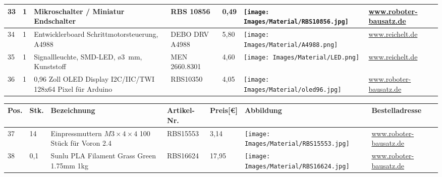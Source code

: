 \begin{center}
\begin{tabularx}{\textwidth}{|p{0.4cm}|p{0.4cm}|X|X|p{1cm}|X|X|}
	\hline
	33 & 1 & Mikroschalter / Miniatur Endschalter & RBS 10856 & 0,49  & \texttt{[image: Images/Material/RBS10856.jpg]} & \href{https://www.roboter-bausatz.de/p/mikroschalter-miniatur-endschalter}{www.roboter-bausatz.de} \\
	\hline
	34 & 1 & Entwicklerboard Schrittmotorsteuerung, A4988 & DEBO DRV A4988 & 5,80  & \texttt{[image: Images/Material/A4988.png]} & \href{https://www.reichelt.de/sg/de/entwicklerboards-schrittmotorsteuerung-a4988-debo-drv-a4988-p282646.html}{www.reichelt.de} \\
	\hline
	35 & 1 & Signallleuchte, SMD-LED, ø3\ mm, Kunststoff & MEN 2660.8301 & 4,60 & \texttt{[image: Images/Material/LED.png]} & \href{https://www.reichelt.de/sg/de/signallleuchte-smd-led-3mm-kunststoff-men-2660-8301-p366869.html}{www.reichelt.de} \\
	\hline
	36 & 1 & 0,96 Zoll OLED Display I2C/IIC/TWI 128x64 Pixel für Arduino & RBS10350 & 4,05 & \texttt{[image: Images/Material/oled96.jpg]} & \href{https://www.roboter-bausatz.de/p/0.96-oled-display-i2c-iic-twi-128x64-pixel-fuer-arduino}{www.roboter-bausatz.de} \\
	\hline

		\end{tabularx}
		
	\fontsize{8}{10}\selectfont
	\begin{tabularx}{\textwidth}{|p{0.4cm}|p{0.4cm}|X|X|p{1cm}|X|X|}
	\hline 
	\textbf{Pos.} & \textbf{Stk.} & \textbf{Bezeichnung} & \textbf{Artikel-Nr.}& \textbf{Preis[€]} & \textbf{Abbildung} & \textbf{Bestelladresse} \\ \hline		
	37 & 14 & Einpressmuttern $M3\times 4 \times 4$ 100 Stück für Voron 2.4 & RBS15553 & 3,14 & \texttt{[image: Images/Material/RBS15553.jpg]} & \href{https://www.roboter-bausatz.de/p/einpressmuttern-m3x4x4-100-stueck-fuer-voron-2.4}{www.roboter-bausatz.de} \\
			\hline
	38 & 0,1 & Sunlu PLA Filament Grass Green 1.75mm 1kg & RBS16624 & 17,95   & \texttt{[image: Images/Material/RBS16624.jpg]} & \href{https://www.roboter-bausatz.de/detail/index/sArticle/6689}{www.roboter-bausatz.de} \\ 
			\hline
			\end{tabularx}
				\label{Materialliste}
\end{center}
